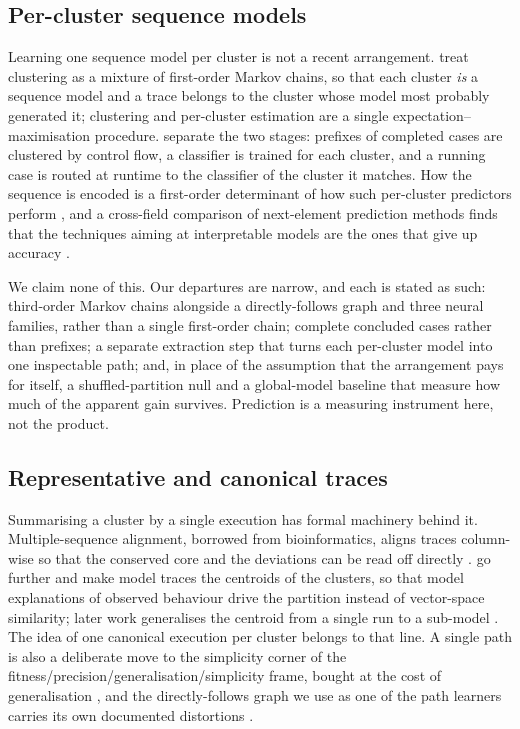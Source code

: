 \subsection{Per-cluster sequence models}\label{subsec:rw-percluster}

Learning one sequence model per cluster is not a recent arrangement. \citet{ferreira2007sequence}
treat clustering as a mixture of first-order Markov chains, so that each cluster \emph{is} a
sequence model and a trace belongs to the cluster whose model most probably generated it;
clustering and per-cluster estimation are a single expectation--maximisation procedure.
\citet{difrancescomarino2019clusteringppm} separate the two stages: prefixes of completed cases
are clustered by control flow, a classifier is trained for each cluster, and a running case is
routed at runtime to the classifier of the cluster it matches. How the sequence is encoded is a
first-order determinant of how such per-cluster predictors perform \citep{teinemaa2019outcome},
and a cross-field comparison of next-element prediction methods finds that the techniques aiming
at interpretable models are the ones that give up accuracy \citep{tax2020interdisciplinary}.

We claim none of this. Our departures are narrow, and each is stated as such: third-order Markov
chains alongside a directly-follows graph and three neural families, rather than a single
first-order chain; complete concluded cases rather than prefixes; a separate extraction step that
turns each per-cluster model into one inspectable path; and, in place of the assumption that the
arrangement pays for itself, a shuffled-partition null and a global-model baseline that measure
how much of the apparent gain survives. Prediction is a measuring instrument here, not the
product.

\subsection{Representative and canonical traces}\label{subsec:rw-representative}

Summarising a cluster by a single execution has formal machinery behind it. Multiple-sequence
alignment, borrowed from bioinformatics, aligns traces column-wise so that the conserved core and
the deviations can be read off directly \citep{bose2012diagnostics}. \citet{chatain2017alignment}
go further and make model traces the centroids of the clusters, so that model explanations of
observed behaviour drive the partition instead of vector-space similarity; later work generalises
the centroid from a single run to a sub-model \citep{boltenhagen2021modelbased}. The idea of one
canonical execution per cluster belongs to that line. A single path is also a deliberate move to
the simplicity corner of the fitness/precision/generalisation/simplicity frame, bought at the cost
of generalisation \citep{buijs2014quality}, and the directly-follows graph we use as one of the
path learners carries its own documented distortions \citep{vanderaalst2019dfg}.


